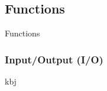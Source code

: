 \documentclass[paper=a4, fontsize=11pt]{scrartcl}
\numberwithin{equation}{section}		%
\numberwithin{figure}{section}			%
\numberwithin{table}{section}			%
\begin{document}
\subsection{Functions}
Functions

\subsubsection{Input/Output (I/O)}
kbj

\end{document}
